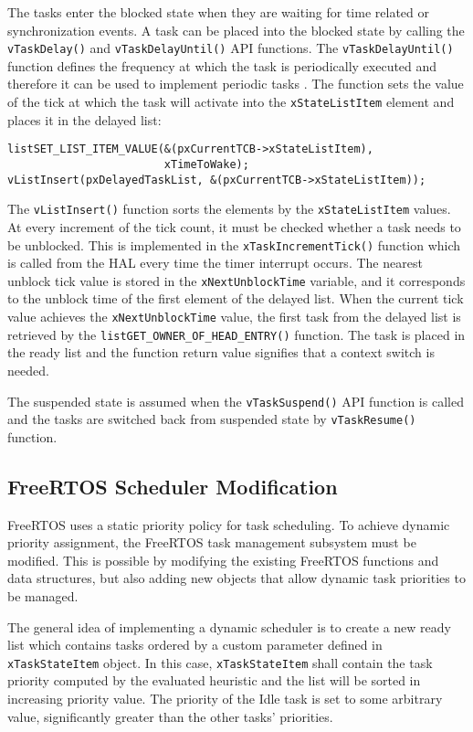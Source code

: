 The tasks enter the blocked state when they are waiting for time related or synchronization events. 
A task can be placed into the blocked state by calling the \verb$vTaskDelay()$ and \verb$vTaskDelayUntil()$ API functions. 
The \verb$vTaskDelayUntil()$ function defines the frequency at which the task is periodically executed and therefore it can be used to implement periodic tasks \cite{carraro2016implementation}.
The function sets the value of the tick at which the task will activate into the \verb$xStateListItem$ element and places it in the delayed list:
\begin{lstlisting}[frame=none, label={lst:delay}, caption={Transition to blocked state.}, captionpos=b]
listSET_LIST_ITEM_VALUE(&(pxCurrentTCB->xStateListItem), 
						xTimeToWake);
vListInsert(pxDelayedTaskList, &(pxCurrentTCB->xStateListItem));
\end{lstlisting}
The \verb$vListInsert()$ function sorts the elements by the \verb$xStateListItem$ values. 
At every increment of the tick count, it must be checked whether a task needs to be unblocked. 
This is implemented in the \verb$xTaskIncrementTick()$ function which is called from the HAL every time the timer interrupt occurs.
The nearest unblock tick value is stored in the \verb$xNextUnblockTime$ variable, and it corresponds to the unblock time of the first element of the delayed list.
When the current tick value achieves the \verb$xNextUnblockTime$ value, the first task from the delayed list is retrieved by the \verb$listGET_OWNER_OF_HEAD_ENTRY()$ function.
The task is placed in the ready list and the function return value signifies that a context switch is needed.

The suspended state is assumed when the \verb$vTaskSuspend()$ API function is called and the tasks are switched back from suspended state by \verb$vTaskResume()$ function.

\subsection{FreeRTOS Scheduler Modification}
FreeRTOS uses a static priority policy for task scheduling. 
To achieve dynamic priority assignment, the FreeRTOS task management subsystem must be modified. 
This is possible by modifying the existing FreeRTOS functions and data structures, but also adding new objects that allow dynamic task priorities to be managed. 

The general idea of implementing a dynamic scheduler is to create a new ready list which contains tasks ordered by a custom parameter defined in \verb$xTaskStateItem$ object.
In this case, \verb$xTaskStateItem$ shall contain the task priority computed by the evaluated heuristic and the list will be sorted in increasing priority value. 
The priority of the Idle task is set to some arbitrary value, significantly greater than the other tasks' priorities. 

